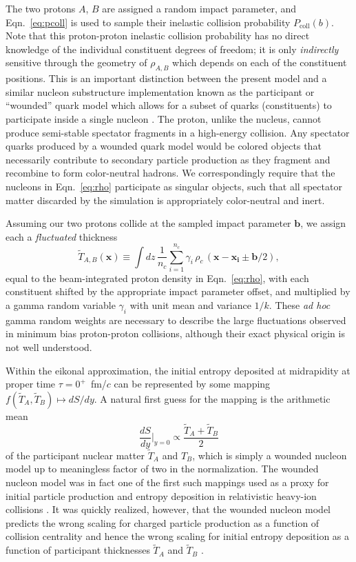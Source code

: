 \documentclass[aps,prc,reprint,amsmath,nofootinbib]{revtex4-1}
\newcommand{\T}{\tilde{T}}
\newcommand{\x}{\mathbf{x}}
\begin{document}
The two protons $A$, $B$ are assigned a random impact parameter, and Eqn.~\eqref{eq:pcoll} is used to sample their inelastic collision probability $P_\mathrm{coll}(b)$.
Note that this proton-proton inelastic collision probability has no direct knowledge of the individual constituent degrees of freedom; it is only \emph{indirectly} sensitive through the geometry of $\rho_{A, B}$ which depends on each of the constituent positions.
This is an important distinction between the present model and a similar nucleon substructure implementation known as the participant or ``wounded'' quark model which allows for a subset of quarks (constituents) to participate inside a single nucleon \cite{ANISOVICH1978477, Broniowski:2016pvx}.
The proton, unlike the nucleus, cannot produce semi-stable spectator fragments in a high-energy collision.
Any spectator quarks produced by a wounded quark model would be colored objects that necessarily contribute to secondary particle production as they fragment and recombine to form color-neutral hadrons.
We correspondingly require that the nucleons in Eqn.~\eqref{eq:rho} participate as singular objects, such that all spectator matter discarded by the simulation is appropriately color-neutral and inert.

Assuming our two protons collide at the sampled impact parameter $\mathbf{b}$, we assign each a \emph{fluctuated} thickness
\begin{equation}
  \label{eq:fluctuated_thick}
  \T_{A, B}(\x) \equiv \int dz\, \frac{1}{n_c} \sum\limits_{i=1}^{n_c} \gamma_i\, \rho_c \,(\mathbf{x} - \mathbf{x_i} \pm \mathbf{b}/2),
\end{equation}
equal to the beam-integrated proton density in Eqn.~\eqref{eq:rho}, with each constituent shifted by the appropriate impact parameter offset, and multiplied by a gamma random variable $\gamma_i$ with unit mean and variance $1/k$.
These \emph{ad hoc} gamma random weights are necessary to describe the large fluctuations observed in minimum bias proton-proton collisions, although their exact physical origin is not well understood.

Within the eikonal approximation, the initial entropy deposited at midrapidity at proper time $\tau=0^+$~fm/$c$ can be represented by some mapping ${f(\T_A, \T_B) \mapsto dS/dy}$.
A natural first guess for the mapping is the arithmetic mean
\begin{equation}
  \frac{dS}{dy}\bigg\vert_{y=0} \propto \frac{\T_A + \T_B}{2}
\end{equation}
of the participant nuclear matter $\T_A$ and $T_B$, which is simply a wounded nucleon model up to meaningless factor of two in the normalization.
The wounded nucleon model was in fact one of the first such mappings used as a proxy for initial particle production and entropy deposition in relativistic heavy-ion collisions \cite{Bialas:1976ed}.
It was quickly realized, however, that the wounded nucleon model predicts the wrong scaling for charged particle production as a function of collision centrality and hence the wrong scaling for initial entropy deposition as a function of participant thicknesses $\T_A$ and $\T_B$ \cite{Kharzeev:2000ph}.
\end{document}
